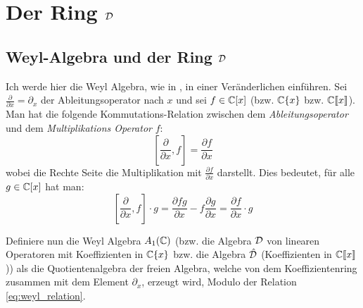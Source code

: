 
\chapter{Der Ring $\mathcal{D}$}

\section{Weyl-Algebra und der Ring $\mathcal{D}$} 
Ich werde hier die Weyl Algebra, wie in
\cite[Chapter~1]{sabbah_cimpa90}, in einer Veränderlichen einführen.
Sei $\frac{\partial}{\partial x}=\partial_x$ der Ableitungsoperator nach $x$
und sei $f \in\mathbb{C}[x]$ (bzw. $\mathbb{C}\{x\}$ bzw. $\mathbb{C}\llbracket x\rrbracket$).
Man hat die folgende Kommutations-Relation zwischen dem
\emph{Ableitungsoperator}
und dem \emph{Multiplikations Operator} $f$:
\begin{equation}\label{eq:weyl_relation}
[\frac{\partial}{\partial x},f]=\frac{\partial f}{\partial x}
\end{equation}
wobei die Rechte Seite die Multiplikation mit $\frac{\partial f}{\partial x}$
darstellt. Dies bedeutet, für alle $g\in\mathbb{C}[x]$ hat man:
\[
[\frac{\partial}{\partial x},f]\cdot g
=\frac{\partial fg}{\partial x} - f\frac{\partial g}{\partial x}
=\frac{\partial f}{\partial x} \cdot g
\]
\begin{defn}
Definiere nun die Weyl Algebra $A_1(\mathbb{C})$ (bzw. die Algebra $\mathcal{D}$ von
linearen Operatoren mit Koeffizienten in $\mathbb{C}\{x\}$ bzw. die Algebra
$\hat{\mathcal{D}}$ (Koeffizienten in $\mathbb{C}\llbracket x\rrbracket$)) als die
Quotientenalgebra der freien Algebra, welche von dem Koeffizientenring
zusammen mit dem Element $\partial_x$, erzeugt wird, Modulo der Relation
\eqref{eq:weyl_relation}.
\end{defn}
\begin{comment}
\begin{defn}
Definiere nun den Ring $\cD_k$ als die
Quotientenalgebra der freien Algebra, welche von dem Koeffizientenring
zusammen mit dem Element $\partial_x$, erzeugt wird, Modulo der Relation
\eqref{eq:weyl_relation}.
Wir schreiben diesen Ring als
\begin{itemize}
\item $A_1(\C)=\C[x]<\partial_x>$ falls $k=\C[x]$, und nennen ihn die
\emph{Weyl Algebra}
\item $\cD=\C\{x\}<\partial_x>$ falls $k=\C\{x\}$
\item $\hat\cD=\Cfx<\partial_x>$ falls $k=\Cfx$
\item $\cD_K=\Ckxl<\partial_x>$ falls
$k=K\overset{\mbox{def}}{=}\C\{x\}[x^{-1}]$
\item $\cD_{\hat K}=\Cfxl<\partial_x>$ falls $k=\hat
K\overset{\mbox{def}}{=}\Cfx[x^{-1}]$
\end{itemize}
\end{defn}
\begin{bem}
Es gilt $\hat \cD[x^{-1}]=\cD_{\hat K}$
\end{bem}
\end{comment}
